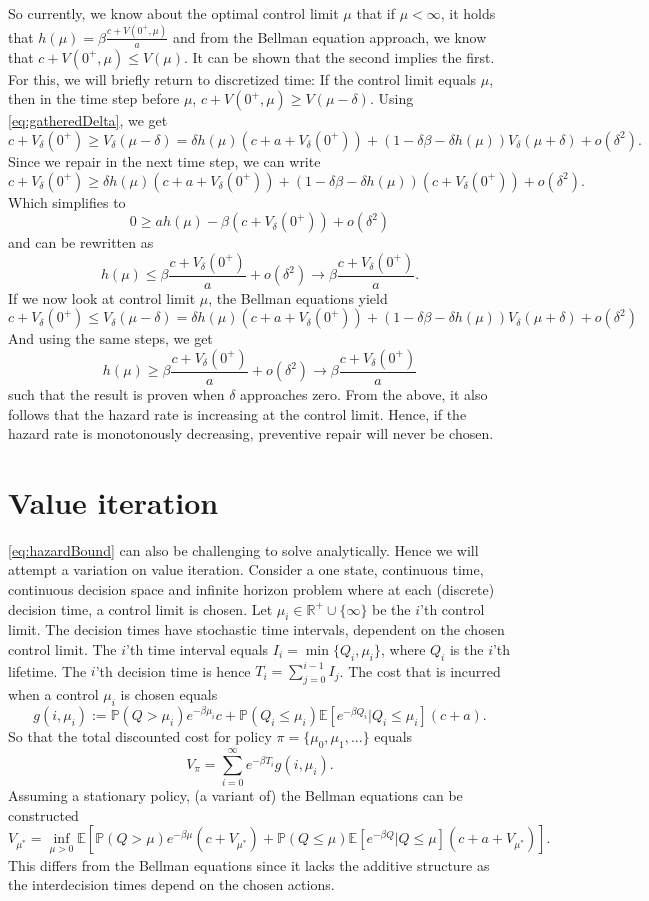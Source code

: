 So currently, we know about the optimal control limit $\mu$ that if $\mu<\infty$, it holds that $h(\mu)=\beta\frac{c+V(0^+,\mu)}{a}$ and from the Bellman equation approach, we know that $c+V(0^+,\mu)\leq V(\mu)$.
It can be shown that the second implies the first.
For this, we will briefly return to discretized time:
If the control limit equals $\mu$, then in the time step before $\mu$, $c+V(0^+,\mu)\geq V(\mu-\delta)$.
Using \eqref{eq:gatheredDelta}, we get
$$
c+V_\delta(0^+)\geq V_\delta(\mu-\delta)=\delta h(\mu)(c+a+ V_\delta(0^+))+(1-\delta\beta-\delta h(\mu)) V_\delta(\mu+\delta)+o(\delta^2).
$$
Since we repair in the next time step, we can write
$$
c+V_\delta(0^+)\geq \delta h(\mu)(c+a+ V_\delta(0^+))+(1-\delta\beta-\delta h(\mu)) (c+V_\delta(0^+))+o(\delta^2).
$$
Which simplifies to
$$
0\geq ah(\mu)-\beta (c+V_\delta(0^+))+o(\delta^2)
$$
and can be rewritten as
$$
h(\mu)\leq \beta\frac{c+V_\delta(0^+)}{a} +o(\delta^2)\rightarrow\beta\frac{c+V_\delta(0^+)}{a}.
$$
If we now look at control limit $\mu$, the Bellman equations yield
$$
c+V_\delta(0^+)\leq V_\delta(\mu-\delta)=\delta h(\mu)(c+a+ V_\delta(0^+))+(1-\delta\beta-\delta h(\mu)) V_\delta(\mu+\delta)+o(\delta^2)
$$
And using the same steps, we get
$$
h(\mu)\geq \beta\frac{c+V_\delta(0^+)}{a} +o(\delta^2)\rightarrow\beta\frac{c+V_\delta(0^+)}{a}
$$
such that the result is proven when $\delta$ approaches zero.
From the above, it also follows that the hazard rate is increasing at the control limit.
Hence, if the hazard rate is monotonously decreasing, preventive repair will never be chosen.

\section{Value iteration}
\eqref{eq:hazardBound} can also be challenging to solve analytically.
Hence we will attempt a variation on value iteration.
Consider a one state, continuous time, continuous decision space and infinite horizon problem where at each (discrete) decision time, a control limit is chosen.
Let $\mu_i\in\mathbb{R}^+\cup\{\infty\}$ be the $i$'th control limit.
The decision times have stochastic time intervals, dependent on the chosen control limit.
The $i$'th time interval equals $I_i=\min\{Q_i,\mu_i\}$, where $Q_i$ is the $i$'th lifetime.
The $i$'th decision time is hence $T_i=\sum_{j=0}^{i-1}I_j$.
The cost that is incurred when a control $\mu_i$ is chosen equals
$$
g(i,\mu_i):=\mathbb{P}(Q>\mu_i)e^{-\beta \mu_i}c+\mathbb{P}(Q_i\leq \mu_i)\mathbb{E}[e^{-\beta Q_i}|Q_i\leq \mu_i](c+a).
$$
So that the total discounted cost for policy $\pi=\{\mu_0,\mu_1,...\}$ equals
\begin{equation}
V_\pi=\sum\limits_{i=0}^\infty e^{-\beta T_i}g(i,\mu_i).
\end{equation}
Assuming a stationary policy, (a variant of) the Bellman equations can be constructed
\begin{equation}\label{eq:notBellman}
V_{\mu^*}=\inf\limits_{\mu>0}\mathbb{E}[\mathbb{P}(Q>\mu)e^{-\beta \mu}(c+V_{\mu^*})+\mathbb{P}(Q\leq \mu)\mathbb{E}[e^{-\beta Q}|Q\leq \mu](c+a+V_{\mu^*})].
\end{equation}
This differs from the Bellman equations since it lacks the additive structure as the interdecision times depend on the chosen actions.

